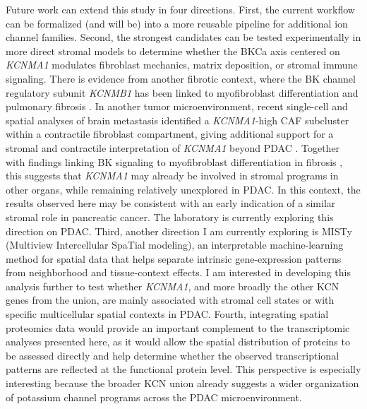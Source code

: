 \documentclass[11pt,a4paper]{article}
\begin{document}
Future work can extend this study in four directions. First, the current workflow can be formalized (and will be) into a more reusable pipeline for additional ion channel families. Second, the strongest candidates can be tested experimentally in more direct stromal models to determine whether the BKCa axis centered on \textit{KCNMA1} modulates fibroblast mechanics, matrix deposition, or stromal immune signaling. There is evidence from another fibrotic context, where the BK channel regulatory subunit \textit{KCNMB1} has been linked to myofibroblast differentiation and pulmonary fibrosis \citep{scruggs2020}. In another tumor microenvironment, recent single-cell and spatial analyses of brain metastasis identified a \textit{KCNMA1}-high CAF subcluster within a contractile fibroblast compartment, giving additional support for a stromal and contractile interpretation of \textit{KCNMA1} beyond PDAC \citep{simon2026}. Together with findings linking BK signaling to myofibroblast differentiation in fibrosis \citep{scruggs2020}, this suggests that \textit{KCNMA1} may already be involved in stromal programs in other organs, while remaining relatively unexplored in PDAC. In this context, the results observed here may be consistent with an early indication of a similar stromal role in pancreatic cancer. The laboratory is currently exploring this direction on PDAC. Third, another direction I am currently exploring is MISTy (Multiview Intercellular SpaTial modeling), an interpretable machine-learning method for spatial data that helps separate intrinsic gene-expression patterns from neighborhood and tissue-context effects. I am interested in developing this analysis further to test whether \textit{KCNMA1}, and more broadly the other KCN genes from the union, are mainly associated with stromal cell states or with specific multicellular spatial contexts in PDAC. Fourth, integrating spatial proteomics data would provide an important complement to the transcriptomic analyses presented here, as it would allow the spatial distribution of proteins to be assessed directly and help determine whether the observed transcriptional patterns are reflected at the functional protein level. This perspective is especially interesting because the broader KCN union already suggests a wider organization of potassium channel programs across the PDAC microenvironment.

\end{document}
